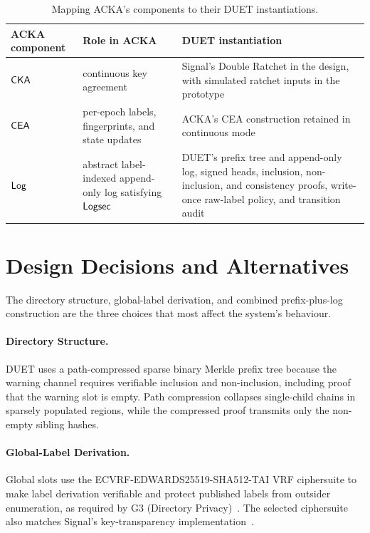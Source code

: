 \begin{table}[htbp]
\centering
\caption{Mapping ACKA's components to their DUET instantiations.}
\label{tab:design-acka}
\footnotesize
\begin{tabularx}{\textwidth}{@{}l>{\raggedright\arraybackslash}p{3.2cm}>{\raggedright\arraybackslash}X@{}}
\toprule
ACKA component & Role in ACKA & DUET instantiation \\
\midrule
$\mathsf{CKA}$ & continuous key agreement & Signal's Double Ratchet in the design, with simulated ratchet inputs in the prototype \\
$\mathsf{CEA}$ & per-epoch labels, fingerprints, and state updates & ACKA's CEA construction retained in continuous mode \\
$\mathsf{Log}$ & abstract label-indexed append-only log satisfying $\mathsf{Logsec}$ & DUET's prefix tree and append-only log, signed heads, inclusion, non-inclusion, and consistency proofs, write-once raw-label policy, and transition audit \\
\bottomrule
\end{tabularx}
\end{table}

\FloatBarrier
\section{Design Decisions and Alternatives}\label{sec:design-decisions}

The directory structure, global-label derivation, and combined prefix-plus-log construction are the
three choices that most affect the system's behaviour.

\paragraph{Directory Structure.} DUET uses a path-compressed sparse binary Merkle prefix tree
because the warning channel requires verifiable inclusion and non-inclusion, including proof that
the warning slot is empty. Path compression collapses single-child chains in sparsely populated
regions, while the compressed proof transmits only the non-empty sibling hashes.

\paragraph{Global-Label Derivation.} Global slots use the
ECVRF-EDWARDS25519-SHA512-TAI VRF ciphersuite to make label derivation verifiable and protect
published labels from outsider enumeration, as required by G3 (Directory
Privacy)~\cite{rfc9381}. The selected ciphersuite also matches Signal's
key-transparency implementation~\cite{signal-kt-server}.

